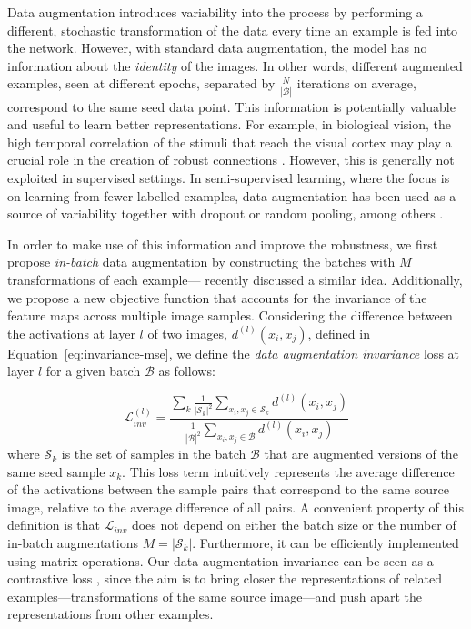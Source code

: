 {Data augmentation introduces variability into the process by performing a different, stochastic transformation of the data every time an example is fed into the network. However, with standard data augmentation, the model has no information about the \textit{identity} of the images. In other words, different augmented examples, seen at different epochs, separated by $\frac{N}{|\mathcal{B}|}$ iterations on average, correspond to the same seed data point. This information is potentially valuable and useful to learn better representations. For example, in biological vision, the high temporal correlation of the stimuli that reach the visual cortex may play a crucial role in the creation of robust connections \citep{becker1999temporalstability, kording2004complexcells, wyss2006temporalstability}. However, this is generally not exploited in supervised settings. In semi-supervised learning, where the focus is on learning from fewer labelled examples, data augmentation has been used as a source of variability together with dropout or random pooling, among others \citep{laine2016ssl}.

In order to make use of this information and improve the robustness, we first propose \textit{in-batch} data augmentation by constructing the batches with $M$ transformations of each example---\citet{hoffer2019batchaugmentation} recently discussed a similar idea. Additionally, we propose a new objective function that accounts for the invariance of the feature maps across multiple image samples. Considering the difference between the activations at layer $l$ of two images, $d^{(l)}(x_{i}, x_{j})$, defined in Equation~\ref{eq:invariance-mse}, we define the \textit{data augmentation invariance} loss at layer $l$ for a given batch $\mathcal{B}$ as follows:

\begin{equation}
\label{eq:invariance-data_aug_inv}
 \mathcal{L}_{inv}^{(l)} = \frac{\sum_{k}\frac{1}{|\mathcal{S}_{k}|^2}\sum_{x_i, x_j \in \mathcal{S}_{k}}d^{(l)}(x_{i}, x_{j})}{\frac{1}{|\mathcal{B}|^2}\sum_{x_i, x_j \in \mathcal{B}}d^{(l)}(x_{i}, x_{j})}
\end{equation}
%
where $\mathcal{S}_{k}$ is the set of samples in the batch $\mathcal{B}$ that are augmented versions of the same seed sample $x_k$. This loss term intuitively represents the average difference of the activations between the sample pairs that correspond to the same source image, relative to the average difference of all pairs. A convenient property of this definition is that $\mathcal{L}_{inv}$ does not depend on either the batch size or the number of in-batch augmentations $M=|\mathcal{S}_{k}|$. Furthermore, it can be efficiently implemented using matrix operations. Our data augmentation invariance can be seen as a contrastive loss \citep{hadsell2006contrastive}, since the aim is to bring closer the representations of related examples---transformations of the same source image---and push apart the representations from other examples.

}
